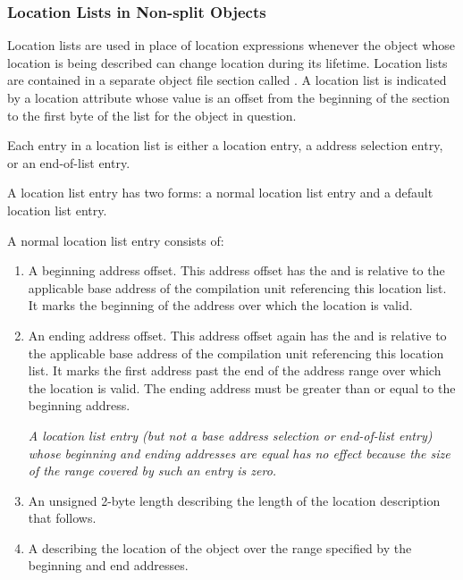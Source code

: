 \subsubsection{Location Lists in Non-split Objects}
\label{chap:locationlistsinnonsplitobjects}
Location lists 
are used in place of location expressions
whenever the object whose location is being described
can change location during its lifetime. 
Location lists
are contained in a separate object file section called
\dotdebugloc{}. A location list is indicated by a location
attribute whose value is an offset from the beginning of
the \dotdebugloc{} section to the first byte of the list for the
object in question.

Each entry in a location list is either a location 
entry,
a 
address selection entry, 
or an 
end-of-list entry.

A location list entry has two forms:
a normal location list entry and a default location list entry.

A 
normal location list entry consists of:
\begin{enumerate}[1. ]
\item A beginning address offset. 
This address offset has the  and is
relative to the applicable base address of the compilation
unit referencing this location list. It marks the beginning
of the address 
over which the location is valid.

\item An ending address offset.  This address offset again
has the  and is relative to the applicable
base address of the compilation unit referencing this location
list. It marks the first address past the end of the address
range over which the location is valid. The ending address
must be greater than or equal to the beginning address.

\textit{A location list entry (but not a base address selection or 
end-of-list entry) whose beginning
and ending addresses are equal has no effect 
because the size of the range covered by such
an entry is zero.}

\item An unsigned 2-byte length describing the length of the location 
description that follows.

\item A  
describing the location of the object over the range specified by
the beginning and end addresses.
\end{enumerate}


